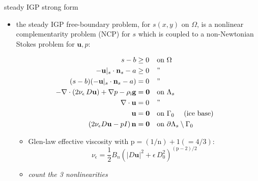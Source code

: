 \documentclass[usepdftitle=false]{beamer}
\newcommand{\tikzmark}[1]{\tikz[overlay,remember picture] \node (#1) {};}
\newcommand{\eps}{\epsilon}
\newcommand{\bn}{\mathbf{n}}
\newcommand{\bu}{\mathbf{u}}
\newcommand{\bzero}{\bm{0}}
\newcommand{\rhoi}{\rho_{\text{i}}}
\newcommand{\pp}{{\text{p}}}
\begin{document}
\begin{frame}{steady IGP strong form}

\begin{itemize}
\item the steady IGP free-boundary problem, for $s(x,y)$ on $\Omega$, is a \alert{nonlinear complementarity problem (NCP) for $s$ which is coupled to a non-Newtonian Stokes problem for $\bu,p$:}

\vspace{-5mm}

\begin{align*}
s - b &\ge 0 && \text{on $\Omega$} & \tikzmark{ncptop} \\
- \bu|_s \cdot \bn_s - a &\ge 0 && \text{''} \\
(s - b) (- \bu|_s \cdot \bn_s - a) &= 0 && \text{''} & \tikzmark{ncpbot} \\
- \nabla \cdot \left(2 \nu_\eps\, D\bu\right) + \nabla p - \rhoi \mathbf{g} &= \bzero && \text{on $\Lambda_s$} & \tikzmark{gstop} \\
\nabla \cdot \bu &= 0 && \text{''} \\
\bu &= \bzero && \text{on $\Gamma_0$ \quad (ice base)} \\
\left(2 \nu_\eps D\bu - pI\right) \bn &= \bzero && \text{on $\partial \Lambda_s \setminus \Gamma_0$} & \tikzmark{gsbot}
\end{align*}



\vspace{-8mm}

    \begin{itemize}
    \item Glen-law effective viscosity with $\text{p}=(1/\text{n})+1(=4/3)$:
      $$\nu_\eps = \frac{1}{2} B_n \left(|D\bu|^2 + \eps\, D_0^2\right)^{(\pp-2)/2}$$
    \item \emph{count the 3 nonlinearities}
    \end{itemize}
\end{itemize}
\end{frame}
\end{document}
